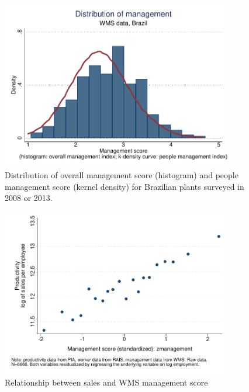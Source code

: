 \clearpage

\clearpage
\begin{figure}
    \includegraphics[width = 0.9\textwidth]{./exhibits/mgmtscor_hist}
    \caption{Distribution of overall management score (histogram) and people management score (kernel density) for Brazilian plants surveyed in 2008 or 2013.}
    \label{fig:pe_kdensity}
\end{figure}

\clearpage


\clearpage
\begin{figure}
    \includegraphics[width=0.9\textwidth]{./exhibits/cvb_fig5_zmanagement}
    \caption{Relationship between sales and WMS management score}
    \label{fig:sales_v_mgmt}
\end{figure}


